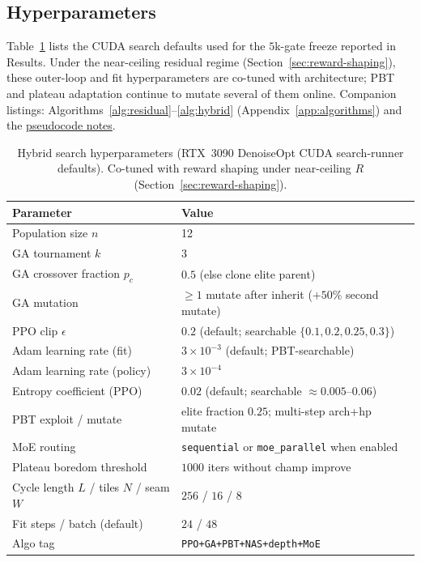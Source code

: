 \subsection{Hyperparameters}
\label{sec:hyperparams}

Table~\ref{tab:hyperparams} lists the CUDA search defaults used for the $5$k-gate freeze reported in Results.
Under the near-ceiling residual regime (Section~\ref{sec:reward-shaping}), these outer-loop and fit hyperparameters are co-tuned with architecture; PBT and plateau adaptation continue to mutate several of them online.
Companion listings: Algorithms~\ref{alg:residual}--\ref{alg:hybrid} (Appendix~\ref{app:algorithms}) and the \href{https://github.com/reeldemo/denoise-opt-meta/blob/master/docs/PSEUDOCODE.md}{pseudocode notes}.

\begin{table}[t]
  \centering
  \small
  \caption{Hybrid search hyperparameters (RTX~3090 DenoiseOpt CUDA search-runner defaults). Co-tuned with reward shaping under near-ceiling $R$ (Section~\ref{sec:reward-shaping}).}
  \label{tab:hyperparams}
  \setlength{\tabcolsep}{3pt}
  \begin{tabular}{@{}lp{}@{}}
    \toprule
    Parameter & Value \\
    \midrule
    Population size $n$ & 12 \\
    GA tournament $k$ & 3 \\
    GA crossover fraction $p_c$ & $0.5$ (else clone elite parent) \\
    GA mutation & $\ge 1$ mutate after inherit ($+50\%$ second mutate) \\
    PPO clip $\epsilon$ & $0.2$ (default; searchable $\{0.1,0.2,0.25,0.3\}$) \\
    Adam learning rate (fit) & $3{\times}10^{-3}$ (default; PBT-searchable) \\
    Adam learning rate (policy) & $3{\times}10^{-4}$ \\
    Entropy coefficient (PPO) & $0.02$ (default; searchable $\approx 0.005$--$0.06$) \\
    PBT exploit / mutate & elite fraction $0.25$; multi-step arch+hp mutate \\
    MoE routing & \texttt{sequential} or \texttt{moe\_parallel} when enabled \\
    Plateau boredom threshold & $1000$ iters without champ improve \\
    Cycle length $L$ / tiles $N$ / seam $W$ & $256$ / $16$ / $8$ \\
    Fit steps / batch (default) & $24$ / $48$ \\
    Algo tag & \texttt{PPO+GA+PBT+NAS+depth+MoE} \\
    \bottomrule
  \end{tabular}
\end{table}

